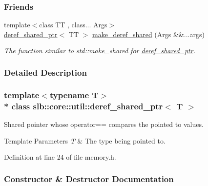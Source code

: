 \subsubsection*{Friends}
\begin{DoxyCompactItemize}
\item 
{\footnotesize template$<$class TT , class... Args$>$ }\\\hyperlink{classslb_1_1core_1_1util_1_1deref__shared__ptr}{deref\+\_\+shared\+\_\+ptr}$<$ TT $>$ \hyperlink{classslb_1_1core_1_1util_1_1deref__shared__ptr_a3731f6226e49a2c28f06c420c984b898}{make\+\_\+deref\+\_\+shared} (Args \&\&...args)
\begin{DoxyCompactList}\small\item\em The function similar to {\ttfamily std\+::make\+\_\+shared} for \hyperlink{classslb_1_1core_1_1util_1_1deref__shared__ptr}{deref\+\_\+shared\+\_\+ptr}. \end{DoxyCompactList}\end{DoxyCompactItemize}


\subsubsection{Detailed Description}
\subsubsection*{template$<$typename T$>$\\*
class slb\+::core\+::util\+::deref\+\_\+shared\+\_\+ptr$<$ T $>$}

Shared pointer whose {\ttfamily operator==} compares the pointed to values. 


\begin{DoxyTemplParams}{Template Parameters}
{\em T} & The type being pointed to. \\
\hline
\end{DoxyTemplParams}


Definition at line 24 of file memory.\+h.



\subsubsection{Constructor \& Destructor Documentation}
